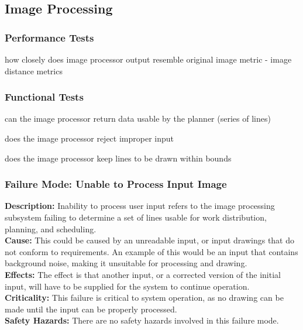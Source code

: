 
\subsection{Image Processing}
\label{sec:verification_image}


\subsubsection{Performance Tests}
\label{sec:image_pt}

how closely does image processor output resemble original image
metric - image distance metrics

\subsubsection{Functional Tests}
\label{sec:image_ft}

can the image processor return data usable by the planner (series of lines)

does the image processor reject improper input

does the image processor keep lines to be drawn within bounds

\subsubsection{Failure Mode: Unable to Process Input Image}
\label{sec:image_fm_input}
\textbf{Description:} Inability to process user input refers to the image processing subsystem failing to determine a set of lines usable for work distribution, planning, and scheduling. \\
\textbf{Cause:} This could be caused by an unreadable input, or input drawings that do not conform to requirements. An example of this would be an input that contains background noise, making it unsuitable for processing and drawing. \\
\textbf{Effects:} The effect is that another input, or a corrected version of the initial input, will have to be supplied for the system to continue operation. \\
\textbf{Criticality:} This failure is critical to system operation, as no drawing can be made until the input can be properly processed. \\
\textbf{Safety Hazards:} There are no safety hazards involved in this failure mode.

